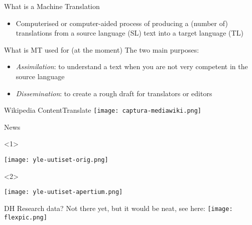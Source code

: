 \documentclass{beamer}
\begin{document}
\begin{frame}{What is a Machine Translation}
    \begin{itemize}
        \item Computerised or computer-aided process of producing a
            (number of) translations from a source language (SL)
            text into a target language (TL)
    \end{itemize}
\end{frame}

\begin{frame}{What is MT used for (at the moment)}
The two main purposes:
    \begin{itemize}
        \item \emph{Assimilation}: to understand a text when you are not
            very competent in the source language
        \item \emph{Dissemination}: to create a rough draft for translators
            or editors
    \end{itemize}
\end{frame}

\begin{frame}{Wikipedia ContentTranslate}
      \texttt{[image: captura-mediawiki.png]}

\end{frame}

\begin{frame}{News}
    \begin{onlyenv}<1>
      \begin{center}
        \texttt{[image: yle-uutiset-orig.png]}
      \end{center}
    \end{onlyenv}
    \begin{onlyenv}<2>
      \begin{center}
        \texttt{[image: yle-uutiset-apertium.png]}
      \end{center}
    \end{onlyenv}

\end{frame}

\begin{frame}{DH Research data?}
    Not there yet, but it would be neat, see here:
    \texttt{[image: flexpic.png]}
\end{frame}
\end{document}
